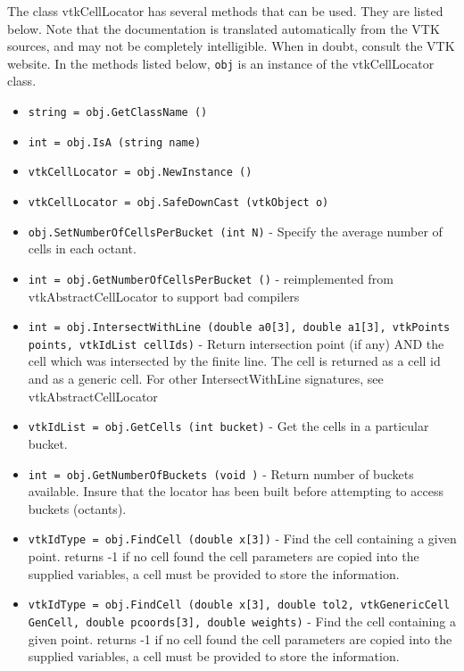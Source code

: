 The class vtkCellLocator has several methods that can be used.
  They are listed below.
Note that the documentation is translated automatically from the VTK sources,
and may not be completely intelligible.  When in doubt, consult the VTK website.
In the methods listed below, \verb|obj| is an instance of the vtkCellLocator class.
\begin{itemize}
\item  \verb|string = obj.GetClassName ()|

\item  \verb|int = obj.IsA (string name)|

\item  \verb|vtkCellLocator = obj.NewInstance ()|

\item  \verb|vtkCellLocator = obj.SafeDownCast (vtkObject o)|

\item  \verb|obj.SetNumberOfCellsPerBucket (int N)| -  Specify the average number of cells in each octant.

\item  \verb|int = obj.GetNumberOfCellsPerBucket ()| -  reimplemented from vtkAbstractCellLocator to support bad compilers

\item  \verb|int = obj.IntersectWithLine (double a0[3], double a1[3], vtkPoints points, vtkIdList cellIds)| -  Return intersection point (if any) AND the cell which was intersected by
 the finite line. The cell is returned as a cell id and as a generic cell.
 For other IntersectWithLine signatures, see vtkAbstractCellLocator

\item  \verb|vtkIdList = obj.GetCells (int bucket)| -  Get the cells in a particular bucket.

\item  \verb|int = obj.GetNumberOfBuckets (void )| -  Return number of buckets available. Insure that the locator has been 
 built before attempting to access buckets (octants).

\item  \verb|vtkIdType = obj.FindCell (double x[3])| -  Find the cell containing a given point. returns -1 if no cell found
 the cell parameters are copied into the supplied variables, a cell must
 be provided to store the information.

\item  \verb|vtkIdType = obj.FindCell (double x[3], double tol2, vtkGenericCell GenCell, double pcoords[3], double weights)| -  Find the cell containing a given point. returns -1 if no cell found
 the cell parameters are copied into the supplied variables, a cell must
 be provided to store the information.


\end{itemize}
